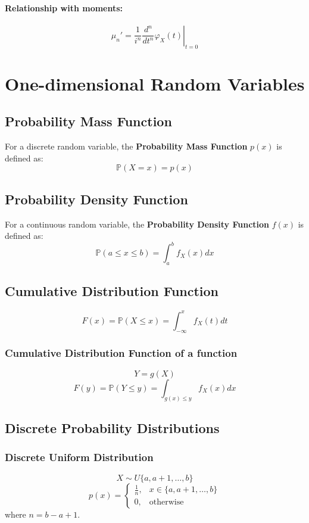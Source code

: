\documentclass{article}
\begin{document}
\paragraph{Relationship with moments:}
\[
    \mu_n' = \frac{1}{i^n} \left.\frac{d^n}{dt^n} \varphi_X(t)\right|_{t=0}
\]

\newpage
\section{One-dimensional Random Variables}

\subsection{Probability Mass Function}
For a discrete random variable, the \textbf{Probability Mass Function} $ p(x) $ is defined as:
\[
    \mathbb{P}(X=x) = p(x)
\]

\subsection{Probability Density Function}
For a continuous random variable, the \textbf{Probability Density Function} $ f(x) $ is defined as:
\[
    \mathbb{P}(a \le x \le b) = \int_{a}^{b} f_X(x)dx
\]

\subsection{Cumulative Distribution Function}
\[
    F(x) = \mathbb{P}(X \le x) = \int_{-\infty}^{x} f_X(t)dt
\]

\subsubsection{Cumulative Distribution Function of a function}
\[
    Y=g(X)
\]
\[
    F(y) = \mathbb{P}(Y \le y) = \int_{g(x) \le y} f_X(x)dx
\]

\subsection{Discrete Probability Distributions}

\subsubsection{Discrete Uniform Distribution}
\[
    X \sim U\{a, a+1, \dots, b\}
\]
\[
    p(x) =
    \begin{cases}
        \frac{1}{n}, & x \in \{a, a+1, \dots, b\} \\
        0, & \text{otherwise}
    \end{cases}
\]
where $n = b - a + 1$.
\end{document}
